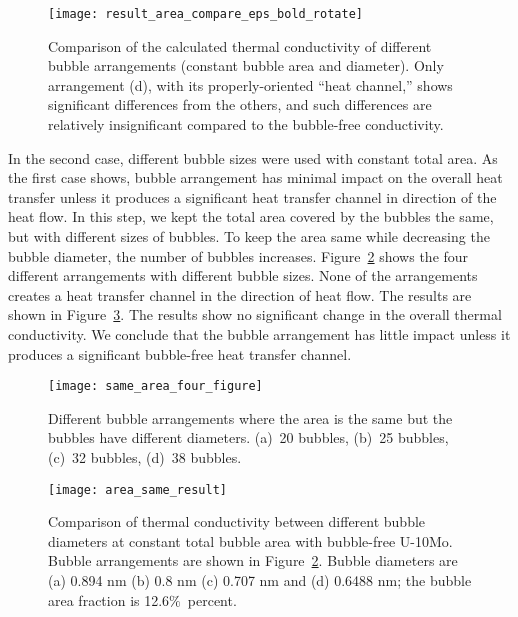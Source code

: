 \begin{figure}
	\centering
	\texttt{[image: result\_area\_compare\_eps\_bold\_rotate]}
    \caption[Comparison of the calculated thermal conductivity of different
        bubble arrangements (constant bubble area and diameter)]{Comparison of the calculated thermal conductivity of different
        bubble arrangements (constant bubble area and diameter). Only
        arrangement (d), with its properly-oriented ``heat channel,'' shows significant
        differences from the others, and such differences are relatively
        insignificant compared to the bubble-free conductivity.}
	\label{fig:five_results}
\end{figure}

In the second case, different bubble sizes were used with constant total area. As the first case shows, bubble arrangement has minimal impact on the overall heat transfer unless it produces a significant heat transfer channel in direction of the heat flow. In this step, we kept the total area covered by the bubbles the same, but with different sizes of bubbles. To keep the area same while decreasing the bubble diameter, the number of bubbles increases. Figure~\ref{fig:area_same_four} shows the four different arrangements with different bubble sizes. None of the arrangements creates a heat transfer channel in the direction of heat flow. The results are shown in Figure~\ref{fig:four_results}. The results show no significant change in the overall thermal conductivity. We conclude that the bubble arrangement has little impact unless it produces a significant bubble-free heat transfer channel. 

 
\begin{figure}
	\centering
	\texttt{[image: same\_area\_four\_figure]}
    \caption[Different bubble arrangements where the area is the same but the
      bubbles have different diameters.]{Different bubble arrangements where the area is the same but the
      bubbles have different diameters. (a)~20 bubbles, (b)~25 bubbles,
      (c)~32 bubbles, (d)~38 bubbles.}
	\label{fig:area_same_four}
\end{figure}
\begin{figure}
	\centering
	\texttt{[image: area\_same\_result]}
	\caption[Comparison of thermal conductivity between different bubble 
      diameters at constant total bubble area with bubble-free U-10Mo.]{Comparison of thermal conductivity between different bubble 
      diameters at constant total bubble area with bubble-free U-10Mo. Bubble
      arrangements are shown in Figure~\ref{fig:area_same_four}.
      Bubble diameters are (a) 0.894 nm (b) 0.8 nm (c) 0.707 nm and (d) 0.6488 nm;
      the bubble area fraction is 12.6$\%$~percent.}
	\label{fig:four_results}
\end{figure}

